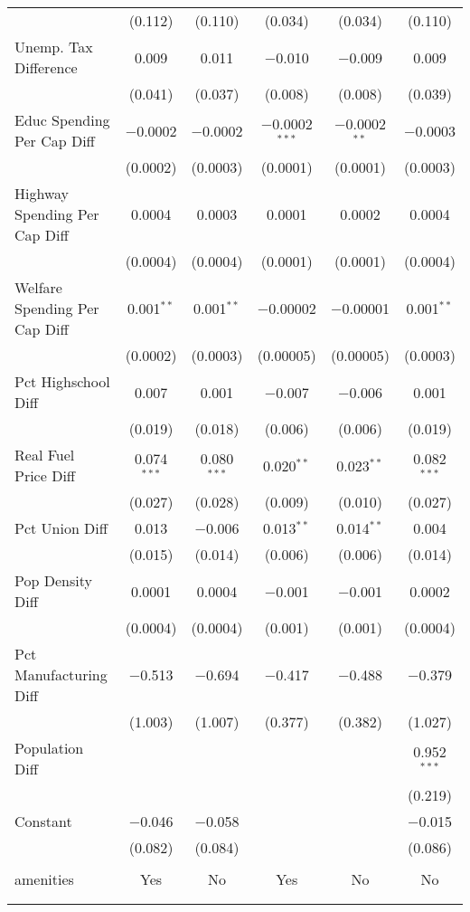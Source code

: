 \begin{table}[!htbp]
\begin{tabular}{@{\extracolsep{5pt}}lccccc}
  & (0.112) & (0.110) & (0.034) & (0.034) & (0.110) \\ 
  Unemp. Tax Difference & 0.009 & 0.011 & $-$0.010 & $-$0.009 & 0.009 \\ 
  & (0.041) & (0.037) & (0.008) & (0.008) & (0.039) \\ 
  Educ Spending Per Cap Diff & $-$0.0002 & $-$0.0002 & $-$0.0002$^{***}$ & $-$0.0002$^{**}$ & $-$0.0003 \\ 
  & (0.0002) & (0.0003) & (0.0001) & (0.0001) & (0.0003) \\ 
  Highway Spending Per Cap Diff & 0.0004 & 0.0003 & 0.0001 & 0.0002 & 0.0004 \\ 
  & (0.0004) & (0.0004) & (0.0001) & (0.0001) & (0.0004) \\ 
  Welfare Spending Per Cap Diff & 0.001$^{**}$ & 0.001$^{**}$ & $-$0.00002 & $-$0.00001 & 0.001$^{**}$ \\ 
  & (0.0002) & (0.0003) & (0.00005) & (0.00005) & (0.0003) \\ 
  Pct Highschool Diff & 0.007 & 0.001 & $-$0.007 & $-$0.006 & 0.001 \\ 
  & (0.019) & (0.018) & (0.006) & (0.006) & (0.019) \\ 
  Real Fuel Price Diff & 0.074$^{***}$ & 0.080$^{***}$ & 0.020$^{**}$ & 0.023$^{**}$ & 0.082$^{***}$ \\ 
  & (0.027) & (0.028) & (0.009) & (0.010) & (0.027) \\ 
  Pct Union Diff & 0.013 & $-$0.006 & 0.013$^{**}$ & 0.014$^{**}$ & 0.004 \\ 
  & (0.015) & (0.014) & (0.006) & (0.006) & (0.014) \\ 
  Pop Density Diff & 0.0001 & 0.0004 & $-$0.001 & $-$0.001 & 0.0002 \\ 
  & (0.0004) & (0.0004) & (0.001) & (0.001) & (0.0004) \\ 
  Pct Manufacturing Diff & $-$0.513 & $-$0.694 & $-$0.417 & $-$0.488 & $-$0.379 \\ 
  & (1.003) & (1.007) & (0.377) & (0.382) & (1.027) \\ 
  Population Diff &  &  &  &  & 0.952$^{***}$ \\ 
  &  &  &  &  & (0.219) \\ 
  Constant & $-$0.046 & $-$0.058 &  &  & $-$0.015 \\ 
  & (0.082) & (0.084) &  &  & (0.086) \\ 
 \hline \\[-1.8ex] 
amenities & Yes & No & Yes & No & No \\ 
\hline \\[-1.8ex] 
\hline 
\hline \\[-1.8ex] 
\end{tabular} 
\end{table} 
